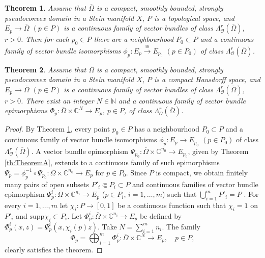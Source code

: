 \documentclass[10pt,a4paper]{amsart}
\newtheorem{theorem}{Theorem}
\newcommand\C{\mathbb{C}}
\newcommand\N{\mathbb{N}}
\newcommand\Oscr{\mathscr{O}}
\newcommand\supp{\mathrm{supp}}
\begin{document}
\begin{theorem}\label{th:stability}
Assume that $\overline \Omega$ is a compact, smoothly bounded, 
strongly pseudoconvex domain in a Stein manifold $X$,  
$P$ is a topological space, and $E_p\to \overline \Omega$ $(p\in P)$ 
is a continuous family of vector bundles of class 
$\Lambda^r_\Oscr(\overline\Omega)$, $r>0$. 
Then for each $p_0\in P$ there are a neighbourhood $P_0\subset P$
and a continuous family of vector bundle isomorphisms
$\phi_p:E_p \stackrel{\cong}{\longrightarrow} E_{p_0}$ $(p\in P_0)$ 
of class $\Lambda^r_\Oscr(\overline\Omega)$. 
\end{theorem}

\begin{theorem}
\label{th:TheoremApar}
Assume that $\overline \Omega$ is a compact, smoothly bounded, 
strongly pseudoconvex domain in a Stein manifold $X$,  
$P$ is a compact Hausdorff space, 
and $E_p\to \overline \Omega$ $(p\in P)$ is a continuous
family of vector bundles of class 
$\Lambda^r_\Oscr(\overline\Omega)$, $r>0$. 
There exist an integer $N\in \N$ and a 
continuous family of vector bundle epimorphisms
$\Phi_p: \overline \Omega\times \C^N \to E_p$, $p\in P$,
of class $\Lambda^r_\Oscr(\overline \Omega)$.
\end{theorem}

\begin{proof}
By Theorem \ref{th:stability}, every point 
$p_0\in P$ has a neighbourhood $P_0\subset P$ and a continuous 
family of vector bundle isomorphisms $\phi_p:E_p\to E_{p_0}$ 
$(p\in P_0)$ of class $\Lambda^r_\Oscr(\overline\Omega)$.
A vector bundle epimorphism
$\Psi_{p_0}: \overline \Omega\times \C^{n_0} \to E_{p_0}$,
given by Theorem \ref{th:TheoremA}, extends to a continuous
family of such epimorphisms $\Psi_p=\phi_p^{-1}\circ \Psi_{p_0}:
\overline \Omega\times \C^{n_0} \to E_{p}$ for $p\in P_0$.
Since $P$ is compact, we obtain finitely many pairs of open 
subsets $P'_i \Subset P_i\subset P$ and 
continuous families of vector bundle 
epimorphism $\Psi^i_p:\overline \Omega\times \C^{n_i}\to E_p$ 
($p\in P_i$,  $i=1,\ldots,m$) such that $\bigcup_{i=1}^m P'_i=P$ .
For every $i=1,\ldots,m$ let $\chi_i:P\to [0,1]$ be a continuous
function such that $\chi_i=1$ on $P'_i$ and $\supp \chi_i\subset P_i$.
Let $\Phi^i_p: \overline \Omega\times \C^{n_i}\to E_p$ be 
defined by $\Phi^i_p(x,z)= \Psi^i_p(x,\chi_i(p)z)$. 
Take $N=\sum_{i=1}^m n_i$. The family 
\[
	\Phi_p=\bigoplus_{i=1}^m \Phi^i_p: 
	\overline \Omega\times \C^{N}\to E_p,
	\quad p\in P,
\]
clearly satisfies the theorem.
\end{proof}
\end{document}
